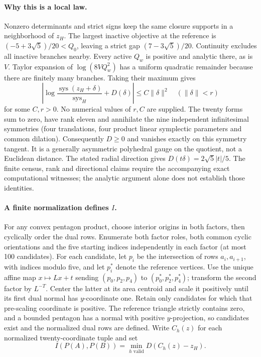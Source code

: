 \paragraph{Why this is a local law.}
Nonzero determinants and strict signs keep the same closure supports in a
neighborhood of $z_H$. The largest inactive objective at the reference is
$(-5+3\sqrt5)/20<Q_0$, leaving a strict gap
$(7-3\sqrt5)/20$. Continuity excludes all inactive branches nearby.
Every active $Q_w$ is positive and analytic there, as is $V$. Taylor
expansion of $\log(8VQ_w^2)$ has a uniform quadratic remainder because
there are finitely many branches. Taking their maximum gives
\[
 \left|\log\frac{\operatorname{sys}(z_H+\delta)}{\operatorname{sys}_H}
                      +D(\delta)\right|\leq C\|\delta\|^2
 \quad(\|\delta\|<r)
\]
for some $C,r>0$. No numerical values of $r,C$ are supplied.
The twenty forms sum to zero, have rank eleven and annihilate the nine
independent infinitesimal symmetries (four translations, four product
linear symplectic parameters and common dilation). Consequently
$D\geq0$ and vanishes exactly on this symmetry tangent. It is a generally
asymmetric polyhedral gauge on the quotient, not a Euclidean distance.
The stated radial direction gives $D(t\delta)=2\sqrt5|t|/5$.
The finite census, rank and directional claims require the accompanying
exact computational witnesses; the analytic argument alone does not
establish those identities.

\paragraph{A finite normalization defines $I$.}
For any convex pentagon product, choose interior origins in both factors,
then cyclically order the dual rows.
Enumerate both factor roles, both common cyclic orientations and the five
starting indices independently in each factor (at most 100 candidates).
For each candidate, let $p_i$ be the intersection of rows $a_i,a_{i+1}$,
with indices modulo five, and let $p_i^*$ denote the reference vertices.
Use the unique affine map $x\mapsto Lx+t$ sending
$(p_0,p_2,p_4)$ to $(p_0^*,p_2^*,p_4^*)$; transform the second factor
by $L^{-T}$. Center the latter at its area centroid and scale it
positively until its first dual normal has $y$-coordinate one.
Retain only candidates for which that pre-scaling coordinate is positive.
The reference triangle strictly contains zero, and a bounded pentagon
has a normal with positive $y$-projection, so candidates exist and the
normalized dual rows are defined. Write $C_h(z)$ for each normalized
twenty-coordinate tuple and set
\[
 I(P(A),P(B))=\min_{h\text{ valid}}D(C_h(z)-z_H).
\]

